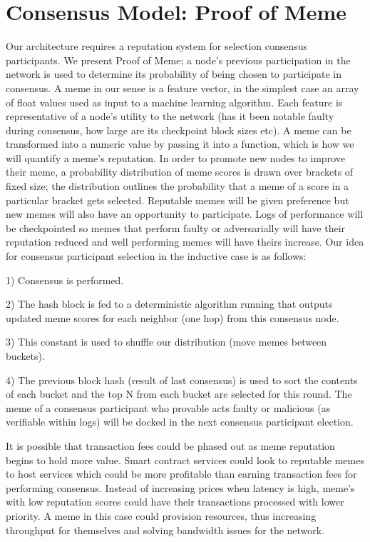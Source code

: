 \documentclass{article}
\begin{document}
\section{Consensus Model: Proof of Meme}
Our architecture requires a reputation system for selection consensus participants. We present Proof of Meme; a node's previous participation in the network is used to determine its probability of being chosen to participate in consensus. A meme in our sense is a feature vector, in the simplest case an array of float values used as input to a machine learning algorithm. Each feature is representative of a node's utility to the network (has it been notable faulty during consensus, how large are its checkpoint block sizes etc). A meme can be transformed into a numeric value by passing it into a function, which is how we will quantify a meme's reputation. In order to promote new nodes to improve their meme, a probability distribution of meme scores is drawn over brackets of fixed size; the distribution outlines the probability that a meme of a score in a particular bracket gets selected. Reputable memes will be given preference but new memes will also have an opportunity to participate. Logs of performance will be checkpointed so memes that perform faulty or adversarially will have their reputation reduced and well performing memes will have theirs increase. Our idea for consensus participant selection in the inductive case is as follows:

1) Consensus is performed. 

2) The hash block is fed to a deterministic algorithm running that outputs updated meme scores for each neighbor (one hop) from this consensus node. 

3) This constant is used to shuffle our distribution (move memes between buckets). 

4) The previous block hash (result of last consensus) is used to sort the contents of each bucket and the top N from each bucket are selected for this round. The meme of a consensus participant who provable acts faulty or malicious (as verifiable within logs) will be docked in the next consensus participant election.

It is possible that transaction fees could be phased out as meme reputation begins to hold more value. Smart contract services could look to reputable memes to host services which could be more profitable than earning transaction fees for performing consensus. Instead of increasing prices when latency is high, meme's with low reputation scores could have their transactions processed with lower priority. A meme in this case could provision resources, thus increasing throughput for themselves and solving bandwidth issues for the network. 
\end{document}
